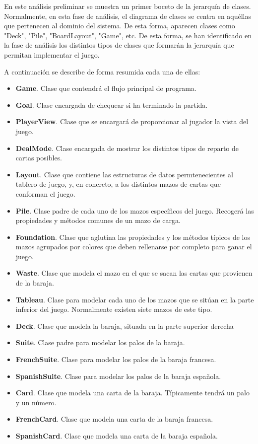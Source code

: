 \documentclass[11pt]{article}
\begin{document}


En este análisis preliminar se muestra un primer boceto de la jerarquía de clases. Normalmente, en esta fase de análisis, el diagrama de clases se centra en aquéllas que pertenecen al dominio del sistema. De esta forma, aparecen clases como "Deck", "Pile", "BoardLayout", "Game", etc. De esta forma, se han identificado en la fase de análisis los distintos tipos de clases que formarán la jerarquía que permitan implementar el juego.

A continuación se describe de forma resumida cada una de ellas:

\begin{itemize}
\item{\textbf{Game}}. Clase que contendrá el flujo principal de programa.
\item{\textbf{Goal}}. Clase encargada de chequear si ha terminado la partida.
\item{\textbf{PlayerView}}. Clase que se encargará de proporcionar al jugador la vista del juego.
\item{\textbf{DealMode}}. Clase encargada de mostrar los distintos tipos de reparto de cartas posibles.
\item{\textbf{Layout}}. Clase que contiene las estructuras de datos permtenecientes al tablero de juego, y, en concreto, a los distintos mazos de cartas que conforman el juego.
\item{\textbf{Pile}}. Clase padre de cada uno de los mazos específicos del juego. Recogerá las propiedades y métodos comunes de un mazo de carga.
\item{\textbf{Foundation}}. Clase que aglutina las propiedades y los métodos típicos de los mazos agrupados por colores que deben rellenarse por completo para ganar el juego.
\item{\textbf{Waste}}. Clase que modela el mazo en el que se sacan las cartas que provienen de la baraja.
\item{\textbf{Tableau}}. Clase para modelar cada uno de los mazos que se sitúan en la parte inferior del juego. Normalmente existen siete mazos de este tipo.
\item{\textbf{Deck}}. Clase que modela la baraja, situada en la parte superior derecha
\item{\textbf{Suite}}. Clase padre para modelar los palos de la baraja.
\item{\textbf{FrenchSuite}}. Clase para modelar los palos de la baraja francesa.
\item{\textbf{SpanishSuite}}. Clase para modelar los palos de la baraja española.
\item{\textbf{Card}}. Clase que modela una carta de la baraja. Típicamente tendrá un palo y un número.
\item{\textbf{FrenchCard}}. Clase que modela una carta de la baraja francesa.
\item{\textbf{SpanishCard}}. Clase que modela una carta de la baraja española.


\end{itemize}
\end{document}
